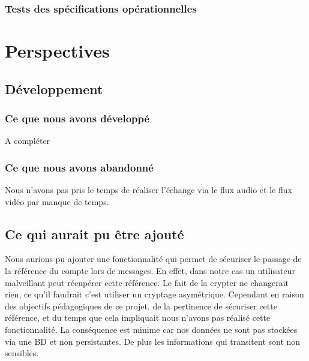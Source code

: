 \documentclass[11pt,dvipsnames,svgnames]{report}
\begin{document}
\subsection{Tests des spécifications opérationnelles}

\chapter{Perspectives}
\section{Développement}
\subsection{Ce que nous avons développé}
A compléter 
\subsection{Ce que nous avons abandonné}
Nous n'avons pas pris le temps de réaliser l'échange via le flux audio et le flux vidéo par manque de temps.
\section{Ce qui aurait pu être ajouté}
Nous aurions pu ajouter une fonctionnalité qui permet de sécuriser le passage de la référence du compte lors de messages. En effet, dans notre cas un utilisateur malveillant peut récupérer cette référence. Le fait de la crypter ne changerait rien, ce qu'il faudrait c'est utiliser un cryptage asymétrique. Cependant en raison des objectifs pédagogiques de ce projet, de la pertinence de sécuriser cette référence, et du temps que cela impliquait nous n'avons pas réalisé cette fonctionnalité. La conséquence est minime car nos données ne sont pas stockées via une BD et non persistantes. De plus les informations qui transitent sont non sensibles. 
\end{document}
